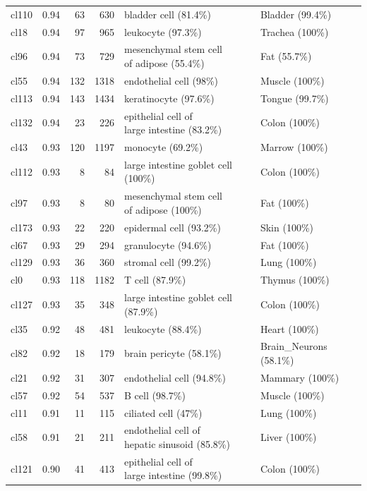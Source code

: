 \begin{table}[ht!]
\begin{tabular}{lrrrll}
  cl110 & 0.94 &  63 & 630 & bladder cell (81.4\%) & Bladder (99.4\%) \\ 
  cl18 & 0.94 &  97 & 965 & leukocyte (97.3\%) & Trachea (100\%) \\ 
  cl96 & 0.94 &  73 & 729 & \specialcell[t]{mesenchymal stem cell\\of adipose (55.4\%)} & Fat (55.7\%) \\ 
  cl55 & 0.94 & 132 & 1318 & endothelial cell (98\%) & Muscle (100\%) \\ 
  cl113 & 0.94 & 143 & 1434 & keratinocyte (97.6\%) & Tongue (99.7\%) \\ 
  cl132 & 0.94 &  23 & 226 & \specialcell[t]{epithelial cell of\\large intestine (83.2\%)} & Colon (100\%) \\ 
  cl43 & 0.93 & 120 & 1197 & monocyte (69.2\%) & Marrow (100\%) \\ 
  cl112 & 0.93 &   8 &  84 & large intestine goblet cell (100\%) & Colon (100\%) \\ 
  cl97 & 0.93 &   8 &  80 & \specialcell[t]{mesenchymal stem cell\\of adipose (100\%)} & Fat (100\%) \\ 
  cl173 & 0.93 &  22 & 220 & epidermal cell (93.2\%) & Skin (100\%) \\ 
  cl67 & 0.93 &  29 & 294 & granulocyte (94.6\%) & Fat (100\%) \\ 
  cl129 & 0.93 &  36 & 360 & stromal cell (99.2\%) & Lung (100\%) \\ 
  cl0 & 0.93 & 118 & 1182 & T cell (87.9\%) & Thymus (100\%) \\ 
  cl127 & 0.93 &  35 & 348 & large intestine goblet cell (87.9\%) & Colon (100\%) \\ 
  cl35 & 0.92 &  48 & 481 & leukocyte (88.4\%) & Heart (100\%) \\ 
  cl82 & 0.92 &  18 & 179 & brain pericyte (58.1\%) & Brain\_Neurons (58.1\%) \\ 
  cl21 & 0.92 &  31 & 307 & endothelial cell (94.8\%) & Mammary (100\%) \\ 
  cl57 & 0.92 &  54 & 537 & B cell (98.7\%) & Muscle (100\%) \\ 
  cl11 & 0.91 &  11 & 115 & ciliated cell (47\%) & Lung (100\%) \\ 
  cl58 & 0.91 &  21 & 211 & \specialcell[t]{endothelial cell of\\hepatic sinusoid (85.8\%)} & Liver (100\%) \\ 
  cl121 & 0.90 &  41 & 413 & \specialcell[t]{epithelial cell of\\large intestine (99.8\%)} & Colon (100\%) \\ 

\end{tabular}
\end{table}
